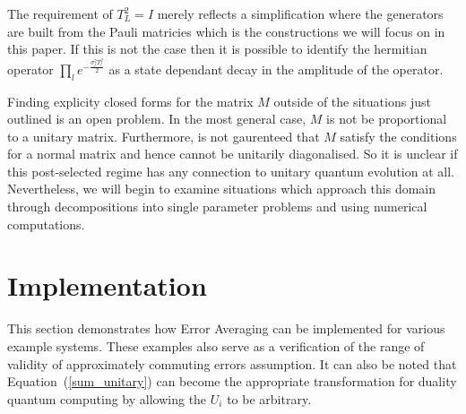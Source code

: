 \documentclass[aps,pra,twocolumn,superscriptaddress,numerical]{revtex4-1}
\begin{document}
The requirement of $T_L^2=I$ merely reflects a simplification where the generators are built from the Pauli matricies which is the constructions we will focus on in this paper.  If this is not the case then it is possible to identify the hermitian operator $\prod_l e^{-\frac{\sigma_l^2 T_l^2}{2}}$ as a state dependant decay in the amplitude of the operator.




Finding explicity closed forms for the matrix $M$ outside of the situations just outlined is an open problem.  In the most general case, $M$ is not be proportional to a unitary matrix.  Furthermore, is not gaurenteed that $M$ satisfy the conditions for a normal matrix and hence cannot be unitarily diagonalised.  So it is unclear if this post-selected regime has any connection to unitary quantum evolution at all.  Nevertheless, we will begin to examine situations which approach this domain through decompositions into single parameter problems and using numerical computations.

\section{Implementation\label{implementation}}

This section demonstrates how Error Averaging can be implemented for various example systems. These examples also serve as a verification of the range of validity of approximately commuting errors assumption. It can also be noted that Equation~(\ref{sum_unitary}) can become the appropriate transformation for duality quantum computing by allowing the $U_{i}$ to be arbitrary\cite{dualityQC}.
\end{document}
